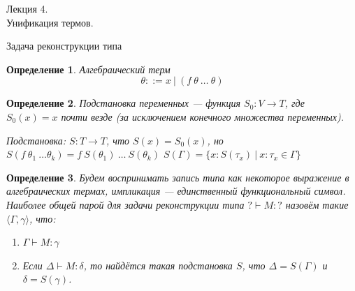 \documentclass[aspectratio=169]{beamer}
\begin{document}
\newtheorem{dfn}{Определение}[section]
\newtheorem{nte}{Замечание}[section]

\newtheorem{axiom}{Аксиома}[section]
\newtheorem{thm}{Теорема}[section]
\newtheorem{lmm}[theorem]{Лемма}
\newtheorem{statement}{Утверждение}[section]
\newtheorem{oun_paragraph}{Пункт}[section]
\newtheorem{cons}{Следствие}[section]
\newtheorem*{exm}{Пример}

\newcommand{\comb}[1]{\operatorname{\bf{\textrm{#1}}}}
\newcommand{\func}[1]{\operatorname{#1}}
\newcommand{\reduction}[1]{{\color{OrangeRed}#1}}
\newcommand{\set}[1]{\left\{#1\right\}}

\def\from#1{\par \parbox{0.7\textwidth}{\par \hfill\raggedleft \it #1}} 

\begin{frame}{}
\begin{center}\Large Лекция 4.\\ \Large Унификация термов.\end{center}
\end{frame}


\begin{frame}{Задача реконструкции типа}
\begin{dfn}Алгебраический терм $$\theta ::= x\:|\:(f\:\theta\:\ldots\:\theta)$$\end{dfn}\vspace{-0.3cm}
\begin{dfn}Подстановка переменных --- функция $S_0: V \rightarrow T$, где $S_0(x) = x$ почти везде
(за исключением конечного множества переменных).

Подстановка: $S: T \rightarrow T$, что $S(x) = S_0(x)$, но $S(f\ \theta_1\ \dots \theta_k) = f\ S(\theta_1)\ \dots\ S(\theta_k)$
$S(\Gamma) = \{ x : S(\tau_x)\ |\ x : \tau_x \in \Gamma\}$
\end{dfn}

\begin{dfn}Будем воспринимать запись типа как некоторое выражение в алгебраических термах, импликация --- единственный
функциональный символ.
Наиболее общей парой для задачи реконструкции типа $?\vdash M:?$ назовём такие $\langle \Gamma, \gamma \rangle$, что:
\begin{enumerate}
\item $\Gamma\vdash M:\gamma$
\item Если $\Delta\vdash M:\delta$, то найдётся такая подстановка $S$, что $\Delta = S(\Gamma)$ и $\delta = S(\gamma)$.
\end{enumerate}
\end{dfn}

\end{frame}
\end{document}
